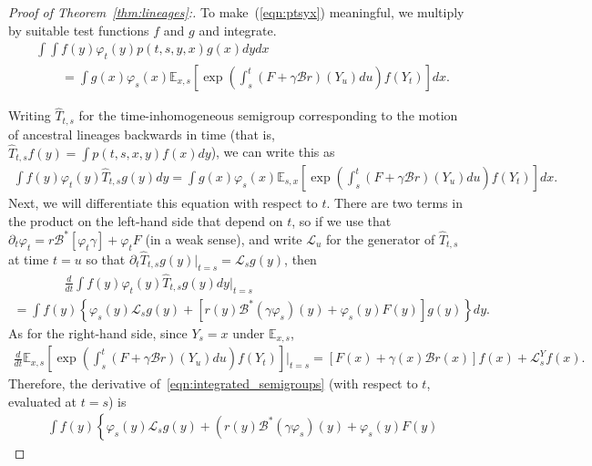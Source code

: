 \documentclass[EJP]{ejpecp} %
\renewcommand{\hat}{\widehat}
\newcommand{\IE}{\mathbb E}
\newcommand{\DG}{\mathcal{B}}  %
\newcommand{\Lgen}{\mathcal{L}}    %
\begin{document}
\begin{proof}[Proof of Theorem~\ref{thm:lineages}:]
To make~(\ref{eqn:ptsyx}) meaningful, we multiply by suitable test functions
$f$ and $g$ and integrate.
\begin{align*}
&\int \int f(y) \varphi_t(y) p(t,s,y,x) g(x) dy dx \\
&\qquad =
\int g(x) \varphi_s(x)
\IE_{x,s}\left[
    \exp\left(
        \int_s^t(F+\gamma\DG r)(Y_u)du
    \right)f(Y_t)
\right] dx .
\end{align*}

Writing $\hat{T}_{t,s}$ for the time-inhomogeneous semigroup
corresponding to the motion of ancestral lineages backwards in time
(that is, $\hat{T}_{t,s} f(y) = \int p(t,s,x,y) f(x) dy$),
we can write this as 
\begin{align} \label{eqn:integrated_semigroups}
    \int f(y)\varphi_t(y)\hat{T}_{t,s}g(y)dy
    =
    \int g(x) \varphi_s(x)
        \IE_{s,x} \left[
            \exp\left(
                \int_s^t(F+\gamma\DG r)(Y_u)du
            \right)f(Y_t)
        \right]dx.
\end{align}
Next, we will differentiate this equation with respect to $t$.
There are two terms in the product on the left-hand side that depend on $t$,
so if we
use that $\partial_t \varphi_t = r \DG^*[ \varphi_t \gamma ] + \varphi_t F$
(in a weak sense),
and write $\Lgen_u$ for the generator of $\hat{T}_{t,s}$ at time $t=u$
so that $\partial_t \hat{T}_{t,s} g(y) \Big|_{t=s} = \Lgen_s g(y)$,
then
\begin{multline*}
    \qquad \qquad
    \frac{d}{dt} 
    \int f(y)\varphi_t(y)\hat{T}_{t,s}g(y)dy
    \Big|_{t=s}
    \\ {}
    =
    \int f(y) \left\{
        \varphi_s(y) \Lgen_s g(y)
        + \left[
            r(y) \DG^*(\gamma \varphi_s)(y) + \varphi_s(y) F(y)
        \right] g(y)
    \right\} dy .
\end{multline*}
As for the right-hand side, since $Y_s=x$ under $\IE_{x,s}$,
\begin{multline*}
    \frac{d}{dt}
        \IE_{x,s}\left[
            \exp\left(
                \int_s^t(F+\gamma\DG r)(Y_u)du
            \right)f(Y_t)
        \right]
    \Bigg|_{t=s}
    =
        \left[F(x)+\gamma(x) \DG r(x)\right] f(x) + \Lgen^Y_s f(x) .
\end{multline*}
Therefore, the derivative of~\eqref{eqn:integrated_semigroups}
(with respect to $t$, evaluated at $t=s$) is
\begin{align*}
&
    \int f(y) \left\{
        \varphi_s(y) \Lgen_s g(y)
        + \left(
            r(y) \DG^*(\gamma \varphi_s)(y) + \varphi_s(y) F(y)

\end{align*}
\end{proof}
\end{document}
